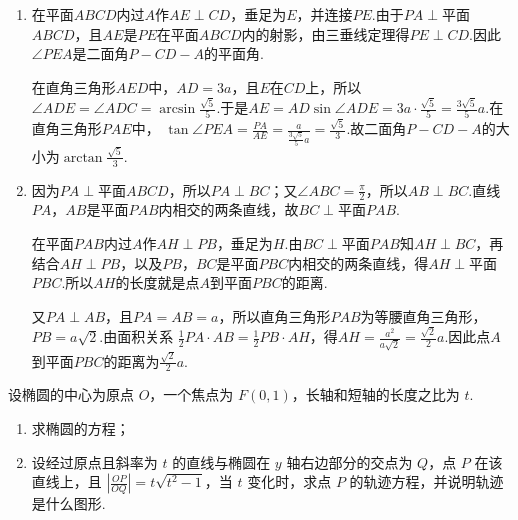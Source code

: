\documentclass[UTF8,a4paper,oneside,11pt]{ctexbook}
\begin{document}
\begin{solution}
\begin{enumerate}
\item 在平面\(ABCD\)内过\(A\)作\(AE\perp CD\)，垂足为\(E\)，并连接\(PE\).由于\(PA\perp\)平面\(ABCD\)，且\(AE\)是\(PE\)在平面\(ABCD\)内的射影，由三垂线定理得\(PE\perp CD\).因此\(\angle PEA\)是二面角\(P-CD-A\)的平面角.

在直角三角形\(AED\)中，\(AD=3a\)，且\(E\)在\(CD\)上，所以\(\angle ADE=\angle ADC=\arcsin\frac{\sqrt5}{5}\).于是\(AE=AD\sin\angle ADE=3a\cdot\frac{\sqrt5}{5}=\frac{3\sqrt5}{5}a\).在直角三角形\(PAE\)中，
\(\tan\angle PEA=\frac{PA}{AE}=\frac{a}{\frac{3\sqrt5}{5}a}=\frac{\sqrt5}{3}\).故二面角\(P-CD-A\)的大小为\(\arctan\frac{\sqrt5}{3}\).

\item 因为\(PA\perp\)平面\(ABCD\)，所以\(PA\perp BC\)；又\(\angle ABC=\frac{\pi}{2}\)，所以\(AB\perp BC\).直线\(PA\)，\(AB\)是平面\(PAB\)内相交的两条直线，故\(BC\perp\)平面\(PAB\).

在平面\(PAB\)内过\(A\)作\(AH\perp PB\)，垂足为\(H\).由\(BC\perp\)平面\(PAB\)知\(AH\perp BC\)，再结合\(AH\perp PB\)，以及\(PB\)，\(BC\)是平面\(PBC\)内相交的两条直线，得\(AH\perp\)平面\(PBC\).所以\(AH\)的长度就是点\(A\)到平面\(PBC\)的距离.

又\(PA\perp AB\)，且\(PA=AB=a\)，所以直角三角形\(PAB\)为等腰直角三角形，\(PB=a\sqrt2\).由面积关系
\(\frac12PA\cdot AB=\frac12PB\cdot AH\)，得\(AH=\frac{a^2}{a\sqrt2}=\frac{\sqrt2}{2}a\).因此点\(A\)到平面\(PBC\)的距离为\(\frac{\sqrt2}{2}a\).
\end{enumerate}
\end{solution}

\begin{problem}
设椭圆的中心为原点 \(O\)，一个焦点为 \(F(0,1)\)，长轴和短轴的长度之比为 \(t\).
\begin{enumerate}
\item 求椭圆的方程；
\item 设经过原点且斜率为 \(t\) 的直线与椭圆在 \(y\) 轴右边部分的交点为 \(Q\)，点 \(P\) 在该直线上，且 \(\left|\frac{OP}{OQ}\right| = t\sqrt{t^2 - 1}\)，当 \(t\) 变化时，求点 \(P\) 的轨迹方程，并说明轨迹是什么图形.
\end{enumerate}
\end{problem}
\end{document}
